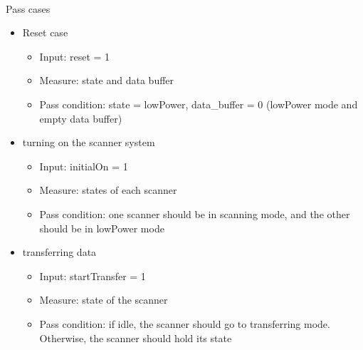 \documentclass{article}
\begin{document}
  \paragraph{} Pass cases
  \begin{itemize}
    \item Reset case
    \begin{itemize}
      \item Input: reset = 1
      \item Measure: state and data buffer
      \item Pass condition: state = lowPower, data\_buffer = 0 (lowPower mode and empty data buffer)
    \end{itemize}

    \item turning on the scanner system
    \begin{itemize}
      \item Input: initialOn = 1
      \item Measure: states of each scanner
      \item Pass condition: one scanner should be in scanning mode, and the other should be in lowPower mode
    \end{itemize}

    \item transferring data
    \begin{itemize}
      \item Input: startTransfer = 1
      \item Measure: state of the scanner
      \item Pass condition: if idle, the scanner should go to transferring mode. Otherwise, the scanner should hold its state
    \end{itemize}
  \end{itemize}
\end{document}
